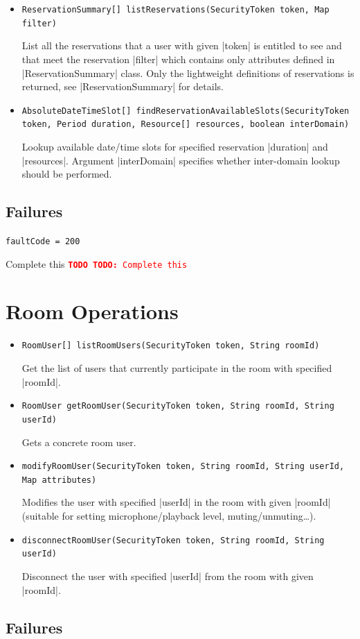 \documentclass[a4paper]{report}
\newenvironment{Api}{\begin{itemize}}{\end{itemize}}
\newcommand{\ApiCode}[1]{\lstinline[style=styleApi]|#1|}
\newcommand{\ApiItem}[1]{\item #1 %

}
\newcommand{\ApiCmd}[1]{\ApiItem{\ApiCode{#1}}}
\newenvironment{ApiFailures}{\begin{compactitem}}{\end{compactitem}}
\newcommand{\ApiFailure}[1]{\ApiItem{\ApiCode{faultCode = #1}}}
\newcommand{\TODO}[1]{%
\def\empty{}%
\def\prvniparametr{#1}%
\ifx\prvniparametr\empty%
\begingroup\tt\textcolor{red}{\noindent\textbf{TODO}}\endgroup
\else%
\begingroup\tt\textcolor{red}{\noindent\textbf{TODO:}\ #1}\endgroup
\fi%
}
\begin{document}
\begin{Api}
\ApiCmd{ReservationSummary[] listReservations(SecurityToken token, Map filter)}
List all the reservations that a user with given |token| is entitled to see and that meet the reservation |filter| which contains only attributes defined in |ReservationSummary| class. Only the lightweight definitions of reservations is returned, see |ReservationSummary| for details.

\ApiCmd{AbsoluteDateTimeSlot[] findReservationAvailableSlots(SecurityToken token, Period duration, Resource[] resources, boolean interDomain)}
Lookup available date/time slots for specified reservation |duration| and |resources|. Argument |interDomain| specifies whether inter-domain lookup should be performed.

\end{Api}

\subsection{Failures}

\begin{ApiFailures}
\ApiFailure{200}
\end{ApiFailures}
\TODO{Complete this}


\section{Room Operations}

\begin{Api}

\ApiCmd{RoomUser[] listRoomUsers(SecurityToken token, String roomId)}
Get the list of users that currently participate in the room with specified |roomId|.

\ApiCmd{RoomUser getRoomUser(SecurityToken token, String roomId, String userId)}
Gets a concrete room user.

\ApiCmd{modifyRoomUser(SecurityToken token, String roomId, String userId, Map attributes)}
Modifies the user with specified |userId| in the room with given |roomId| (suitable for setting microphone/playback level, muting/unmuting\ldots).

\ApiCmd{disconnectRoomUser(SecurityToken token, String roomId, String userId)}
Disconnect the user with specified |userId| from the room with given |roomId|.

\end{Api}

\subsection{Failures}
\end{document}

